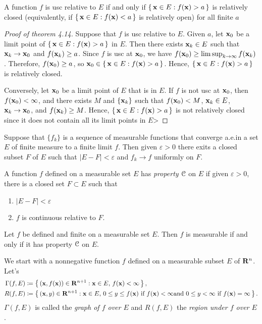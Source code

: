 \begin{theorem*}[4.14]
A function $f$ is usc relative to $E$ if and only if $\left\{\,\mathbf{x}\in
  E:f(\mathbf{x})>a\,\right\}$ is relatively closed (equivalently, if
$\left\{\,\mathbf{x}\in E:f(\mathbf{x})<a\,\right\}$ is relatively open) for all finite
$a$
\end{theorem*}
\begin{proof}[Proof of theorem 4.14]
Suppose that $f$ is usc relative to $E$. Given $a$, let $\mathbf{x}_0$ be a limit
point of $\left\{\,\mathbf{x}\in E:f(\mathbf{x})>a\,\right\}$ in $E$. Then there exists
$\mathbf{x}_k\in E$ such that $\mathbf{x}_k\to\mathbf{x}_0$ and $f(\mathbf{x}_k)\geq a$. Since $f$
is usc at $\mathbf{x}_0$, we have $f(\mathbf{x}_0)\geq\limsup_{k\to\infty}
f(\mathbf{x}_k)$. Therefore, $f(\mathbf{x}_0)\geq a$, so $\mathbf{x}_0\in\left\{\,\mathbf{x}\in
  E:f(\mathbf{x})>a\,\right\}$. Hence, $\left\{\,\mathbf{x}\in E:f(\mathbf{x})>a\,\right\}$
is relatively closed.

Conversely, let $\mathbf{x}_0$ be a limit point of $E$ that is in $E$. If $f$ is
not usc at $\mathbf{x}_0$, then $f(\mathbf{x}_0)<\infty$, and there exists $M$ and
$\left\{ \mathbf{x}_k \right\}$ such that $f(\mathbf{x}_0)<M$, $\mathbf{x}_k\in E$,
$\mathbf{x}_k\to\mathbf{x}_0$, and $f(\mathbf{x}_k)\geq M$. Hence, $\left\{\,\mathbf{x}\in
  E:f(\mathbf{x})>a\,\right\}$ is not relatively closed since it does not contain
all its limit points in $E$>
\end{proof}
\begin{theorem*}
Suppose that $\{f_k\}$ is a sequence of measurable functions that converge
a.e.\@ in a set $E$ of finite measure to a finite limit $f$. Then given
$\varepsilon>0$ there exits a closed subset $F$ of $E$ such that $|E\minus
F|<\varepsilon$ and $f_k\to f$ uniformly on $F$.
\end{theorem*}
A function $f$ defined on a measurable set $E$ has \emph{property $\mathcal{C}$}
on $E$ if given $\varepsilon>0$, there is a closed set $F\subset E$ such
that
\begin{enumerate}[label=(\roman*)]
\item $|E\minus F|<\varepsilon$
\item $f$ is continuous relative to $F$.
\end{enumerate}
\begin{theorem*}
Let $f$ be defined and finite on a measurable set $E$. Then $f$ is
measurable if and only if it has property $\mathcal{C}$ on $E$.
\end{theorem*}

We start with a nonnegative function $f$ defined on a measurable subset $E$
of $\mathbf{R}^n$. Let's
\begin{equation}
\label{eq:graph-and-region}
\begin{aligned}
\Gamma(f,E)&\coloneqq\left\{\,(\mathbf{x},f(\mathbf{x}))\in\mathbf{R}^{n+1}:\text{$\mathbf{x}\in
    E$, $f(\mathbf{x})<\infty$}\,\right\},\\
R(f,E)&\coloneqq\left\{\,(\mathbf{x},y)\in\mathbf{R}^{n+1}:\text{$\mathbf{x}\in E$, $0\leq
    y\leq f(\mathbf{x})$ if $f(\mathbf{x})<\infty$and $0\leq y<\infty$ if
    $f(\mathbf{x})=\infty$}\,\right\}.
\end{aligned}
\end{equation}
$\Gamma(f,E)$ is called the \emph{graph of $f$ over $E$} and $R(f,E)$ the
\emph{region under $f$ over $E$}.

